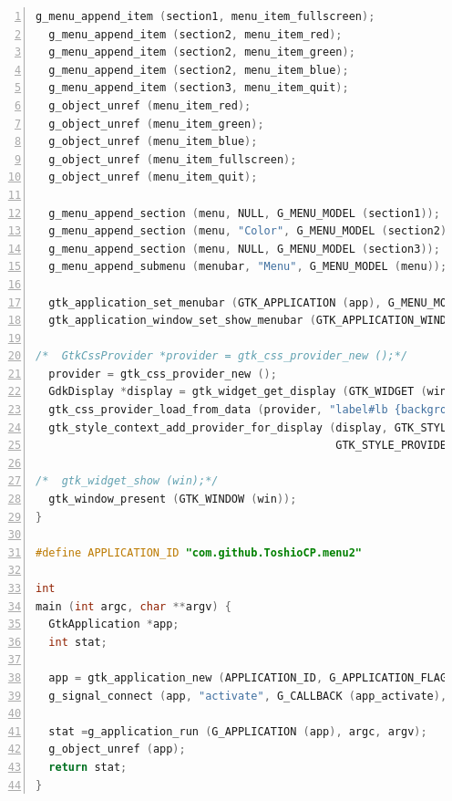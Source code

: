 \begin{lstlisting}[language=C, numbers=left]
  g_menu_append_item (section1, menu_item_fullscreen);
  g_menu_append_item (section2, menu_item_red);
  g_menu_append_item (section2, menu_item_green);
  g_menu_append_item (section2, menu_item_blue);
  g_menu_append_item (section3, menu_item_quit);
  g_object_unref (menu_item_red);
  g_object_unref (menu_item_green);
  g_object_unref (menu_item_blue);
  g_object_unref (menu_item_fullscreen);
  g_object_unref (menu_item_quit);

  g_menu_append_section (menu, NULL, G_MENU_MODEL (section1));
  g_menu_append_section (menu, "Color", G_MENU_MODEL (section2));
  g_menu_append_section (menu, NULL, G_MENU_MODEL (section3));
  g_menu_append_submenu (menubar, "Menu", G_MENU_MODEL (menu));

  gtk_application_set_menubar (GTK_APPLICATION (app), G_MENU_MODEL (menubar));
  gtk_application_window_set_show_menubar (GTK_APPLICATION_WINDOW (win), TRUE);

/*  GtkCssProvider *provider = gtk_css_provider_new ();*/
  provider = gtk_css_provider_new ();
  GdkDisplay *display = gtk_widget_get_display (GTK_WIDGET (win));
  gtk_css_provider_load_from_data (provider, "label#lb {background-color: red;}", -1);
  gtk_style_context_add_provider_for_display (display, GTK_STYLE_PROVIDER (provider),
                                              GTK_STYLE_PROVIDER_PRIORITY_USER);

/*  gtk_widget_show (win);*/
  gtk_window_present (GTK_WINDOW (win));
}

#define APPLICATION_ID "com.github.ToshioCP.menu2"

int
main (int argc, char **argv) {
  GtkApplication *app;
  int stat;

  app = gtk_application_new (APPLICATION_ID, G_APPLICATION_FLAGS_NONE);
  g_signal_connect (app, "activate", G_CALLBACK (app_activate), NULL);

  stat =g_application_run (G_APPLICATION (app), argc, argv);
  g_object_unref (app);
  return stat;
}
\end{lstlisting}

